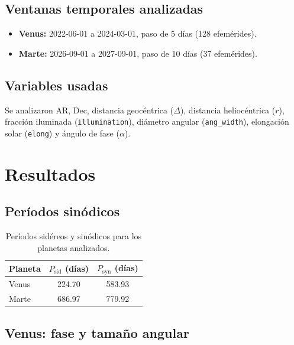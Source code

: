 \subsection{Ventanas temporales analizadas}

\begin{itemize}
  \item \textbf{Venus:} 2022-06-01 a 2024-03-01, paso de 5 días (128 efemérides).
  \item \textbf{Marte:} 2026-09-01 a 2027-09-01, paso de 10 días (37 efemérides).
\end{itemize}

\subsection{Variables usadas}

Se analizaron AR, Dec, distancia geocéntrica ($\Delta$), distancia heliocéntrica
($r$), fracción iluminada (\texttt{illumination}), diámetro angular
(\texttt{ang\_width}), elongación solar (\texttt{elong}) y ángulo de fase
($\alpha$).

\section{Resultados}

\subsection{Períodos sinódicos}

\begin{table}[H]
\centering
\caption{Períodos sidéreos y sinódicos para los planetas analizados.}
\label{tab:periodos}
\begin{tabular}{lcc}
\toprule
\textbf{Planeta} & \textbf{$P_{\text{sid}}$ (días)} & \textbf{$P_{\text{syn}}$ (días)} \\
\midrule
Venus & 224.70 & 583.93 \\
Marte & 686.97 & 779.92 \\
\bottomrule
\end{tabular}
\end{table}

\subsection{Venus: fase y tamaño angular}

